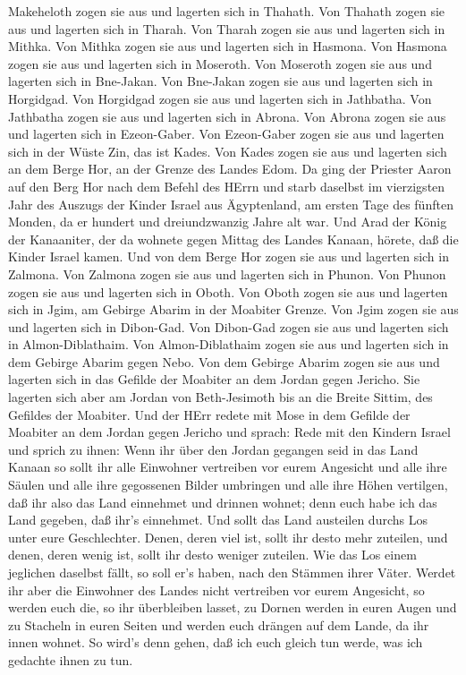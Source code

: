Makeheloth zogen sie aus und lagerten sich in Thahath.  Von
Thahath zogen sie aus und lagerten sich in Tharah.  Von
Tharah zogen sie aus und lagerten sich in Mithka.  Von
Mithka zogen sie aus und lagerten sich in Hasmona.  Von
Hasmona zogen sie aus und lagerten sich in Moseroth.  Von
Moseroth zogen sie aus und lagerten sich in Bne-Jakan.  Von
Bne-Jakan zogen sie aus und lagerten sich in Horgidgad. 
Von Horgidgad zogen sie aus und lagerten sich in Jathbatha.
 Von Jathbatha zogen sie aus und lagerten sich in Abrona.
 Von Abrona zogen sie aus und lagerten sich in Ezeon-Gaber.
 Von Ezeon-Gaber zogen sie aus und lagerten sich in der
Wüste Zin, das ist Kades.  Von Kades zogen sie aus und
lagerten sich an dem Berge Hor, an der Grenze des Landes Edom.
 Da ging der Priester Aaron auf den Berg Hor nach dem
Befehl des HErrn und starb daselbst im vierzigsten Jahr des Auszugs der
Kinder Israel aus Ägyptenland, am ersten Tage des fünften Monden,
 da er hundert und dreiundzwanzig Jahre alt war.
 Und Arad der König der Kanaaniter, der da wohnete gegen
Mittag des Landes Kanaan, hörete, daß die Kinder Israel kamen.
 Und von dem Berge Hor zogen sie aus und lagerten sich in
Zalmona.  Von Zalmona zogen sie aus und lagerten sich in
Phunon.  Von Phunon zogen sie aus und lagerten sich in
Oboth.  Von Oboth zogen sie aus und lagerten sich in Jgim,
am Gebirge Abarim in der Moabiter Grenze.  Von Jgim zogen
sie aus und lagerten sich in Dibon-Gad.  Von Dibon-Gad
zogen sie aus und lagerten sich in Almon-Diblathaim.  Von
Almon-Diblathaim zogen sie aus und lagerten sich in dem Gebirge Abarim
gegen Nebo.  Von dem Gebirge Abarim zogen sie aus und
lagerten sich in das Gefilde der Moabiter an dem Jordan gegen Jericho.
 Sie lagerten sich aber am Jordan von Beth-Jesimoth bis an
die Breite Sittim, des Gefildes der Moabiter.  Und der HErr
redete mit Mose in dem Gefilde der Moabiter an dem Jordan gegen Jericho
und sprach:  Rede mit den Kindern Israel und sprich zu
ihnen: Wenn ihr über den Jordan gegangen seid in das Land Kanaan
 so sollt ihr alle Einwohner vertreiben vor eurem Angesicht
und alle ihre Säulen und alle ihre gegossenen Bilder umbringen und alle
ihre Höhen vertilgen,  daß ihr also das Land einnehmet und
drinnen wohnet; denn euch habe ich das Land gegeben, daß ihr's
einnehmet.  Und sollt das Land austeilen durchs Los unter
eure Geschlechter. Denen, deren viel ist, sollt ihr desto mehr zuteilen,
und denen, deren wenig ist, sollt ihr desto weniger zuteilen. Wie das
Los einem jeglichen daselbst fällt, so soll er's haben, nach den Stämmen
ihrer Väter.  Werdet ihr aber die Einwohner des Landes
nicht vertreiben vor eurem Angesicht, so werden euch die, so ihr
überbleiben lasset, zu Dornen werden in euren Augen und zu Stacheln in
euren Seiten und werden euch drängen auf dem Lande, da ihr innen wohnet.
 So wird's denn gehen, daß ich euch gleich tun werde, was
ich gedachte ihnen zu tun.

